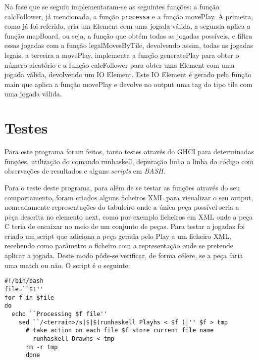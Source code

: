 Na fase que se seguiu implementaram-se as seguintes funções: a função calcFollower, já mencionada, a função \texttt{processa} e a função movePlay. A primeira, como já foi referido, cria um Element com uma jogada válida, a segunda aplica a função mapBoard, ou seja, a função que obtém todas as jogadas possíveis, e filtra essas jogadas com a função legalMovesByTile, devolvendo assim, todas as jogadas legais, a terceira a movePlay, implementa a função generatePlay para obter o número aleatório e a função calcFollower para obter uma Element com uma jogada válida, devolvendo um IO Element. Este IO Element é gerado pela função main que aplica a função movePlay e devolve no output uma tag do tipo tile com uma jogada válida.




\section{Testes}

Para este  programa foram  feitos, tanto  testes através  do GHCI  para determinadas  funções, utilização
do  comando  runhaskell,  depuração linha  a  linha  do  código  com observações  de  resultados e alguns
\emph{scripts} em \emph{BASH}. 

Para o teste deste programa, para além de se testar as funções através do seu comportamento, foram criados alguns ficheiros XML para visualizar o seu output, nomeadamente representações do tabuleiro onde a única peça possível seria a peça descrita no elemento next, como por exemplo ficheiros em XML onde a peça C teria de encaixar no meio de um conjunto de peças. Para testar a jogadas foi criado um script que adiciona a peça gerada pelo Play a um ficheiro XML, recebendo como parâmetro o ficheiro com a representação onde se pretende aplicar a jogada. Deste modo pôde-se verificar, de forma célere, se a peça faria uma match ou não. O script é o seguinte:
 
\begin{verbatim}
#!/bin/bash
file=``$1''
for f in $file
do
  echo ``Processing $f file'' 
    sed ``/<terrain>/s|$|$(runhaskell Playhs < $f )|'' $f > tmp
      # take action on each file $f store current file name
        runhaskell Drawhs < tmp
	  rm -r tmp
	  done
	  

\end{verbatim}




